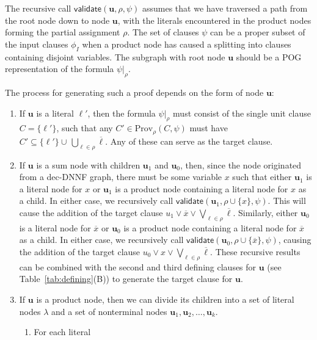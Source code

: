 \documentclass[letterpaper,USenglish,cleveref, autoref, thm-restate]{lipics-v2021}
\newcommand{\obar}[1]{\overline{#1}}
\newcommand{\lit}{\ell}
\newcommand{\assign}{\alpha}
\newcommand{\passign}{\rho}
\newcommand{\validate}{\textsf{validate}}
\newcommand{\prov}{\textrm{Prov}}
\newcommand{\inputformula}{\phi_I}
\newcommand{\makenode}[1]{\mathbf{#1}}
\newcommand{\nodeu}{\makenode{u}}
\newcommand{\simplify}[2]{#1|_{#2}}
\begin{document}
The recursive call $\validate(\nodeu, \passign, \psi)$ assumes that we have
traversed a path from the root node down to node $\nodeu$, with the
literals encountered in the product nodes forming the partial
assignment $\passign$.  The set of clauses $\psi$ can be a proper
subset of the input clauses $\inputformula$ when a product node has caused
a splitting into clauses containing disjoint variables.
The subgraph with root node $\nodeu$ should be a POG representation of the formula
$\simplify{\psi}{\passign}$.

The process for generating such a proof depends on the form of node $\nodeu$:
\begin{enumerate}
\item If $\nodeu$ is a literal $\lit'$, then the formula
  $\simplify{\psi}{\passign}$ must consist of the single unit clause
  $C = \{\lit'\}$, such that any $C' \in \prov_{\passign}(C, \psi)$ must have $C' \subseteq \{ \lit' \} \cup\, \bigcup_{\lit \in \passign} \obar{\lit}$.
  Any of these can
  serve as the target clause.
\item If $\nodeu$ is a sum node with children $\nodeu_1$ and $\nodeu_0$,
  then, since the node originated from a dec-DNNF graph, there must be
  some variable $x$ such that either $\nodeu_1$ is a literal node for $x$ or $\nodeu_1$ is a
  product node containing a literal node for $x$ as a child.  In either case, we
  recursively call $\validate(\nodeu_1, \passign \cup \{ x \}, \psi)$.
  This will cause the addition of the target clause
  $u_1 \lor \obar{x} \lor \bigvee_{\lit \in \passign} \obar{\lit}$.
Similarly, either $\nodeu_0$ is a literal node for $\obar{x}$ or $\nodeu_0$ is a product node containing a literal node for $\obar{x}$ as
  a child.  In either case, we recursively call $\validate(\nodeu_0, \passign \cup \{ \obar{x} \}, \psi)$,
  causing the addition of the target clause
  $u_0 \lor x \lor \bigvee_{\lit \in \passign} \obar{\lit}$.
  These recursive results can be combined with the second and third defining clauses for $\nodeu$
(see Table~\ref{tab:defining}(B))
  to generate the target clause for $\nodeu$.
\item If $\nodeu$ is a product node, then we can divide its children
  into a set of literal nodes $\lambda$ and a set of nonterminal nodes $\nodeu_1, \nodeu_2, \ldots, \nodeu_k$.
  \begin{enumerate}
    \item For each literal

\end{enumerate}
\end{enumerate}
\end{document}
